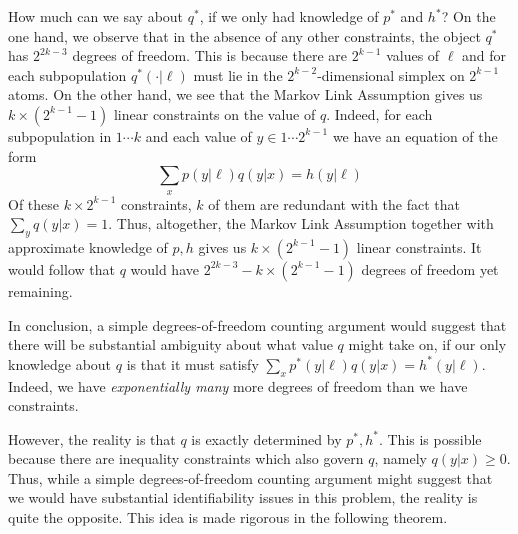 How much can we say about $q^*$, if we only had knowledge of $p^*$ and $h^*$?  On the one hand, we observe that in the absence of any other constraints, the object $q^*$ has $2^{2k-3}$ degrees of freedom.  This is because there are $2^{k-1}$ values of $\ell$ and for each subpopulation $q^*(\cdot|\ell)$ must lie in the $2^{k-2}$-dimensional simplex on $2^{k-1}$ atoms.  On the other hand, we see that the Markov Link Assumption gives us $k\times(2^{k-1}-1)$ linear constraints on the value of $q$.  Indeed, for each subpopulation in $1\cdots k$ and each value of $y \in 1 \cdots 2^{k-1}$ we have an equation of the form
\[
\sum_x p(y|\ell)q(y|x)=h(y|\ell)
\]
Of these $k\times2^{k-1}$ constraints, $k$ of them are redundant with the fact that $\sum_y q(y|x)=1$.  Thus, altogether, the Markov Link Assumption together with approximate knowledge of $p,h$ gives us $k\times(2^{k-1}-1)$ linear constraints.  It would follow that $q$ would have $2^{2k-3} - k\times(2^{k-1}-1)$ degrees of freedom yet remaining.  

In conclusion, a simple degrees-of-freedom counting argument would suggest that there will be substantial ambiguity about what value $q$ might take on, if our only knowledge about $q$ is that it must satisfy $\sum_x p^*(y|\ell)q(y|x)=h^*(y|\ell)$.  Indeed, we have \emph{exponentially many} more degrees of freedom than we have constraints.  

However, the reality is that $q$ is exactly determined by $p^*,h^*$.  This is possible because there are inequality constraints which also govern $q$, namely $q(y|x)\geq 0$.  Thus, while a simple degrees-of-freedom counting argument might suggest that we would have substantial identifiability issues in this problem, the reality is quite the opposite.  This idea is made rigorous in the following theorem.  

